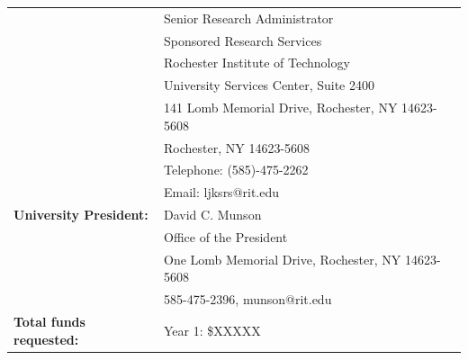 \documentclass[12pt]{article}
\begin{document}
\begin{titlepage}
\begin{tabular}{ L{50mm} L{100mm} }
   & \vspace{-8mm} \normalsize Senior Research Administrator  \\
   & \vspace{-10mm} \normalsize Sponsored Research Services  \\
   & \vspace{-12mm} \normalsize Rochester Institute of Technology  \\
   & \vspace{-14mm} \normalsize University Services Center, Suite 2400  \\
   & \vspace{-16mm} \normalsize 141 Lomb Memorial Drive, Rochester, NY 14623-5608   \\
   & \vspace{-18mm} \normalsize Rochester, NY 14623-5608  \\
   & \vspace{-20mm} \normalsize Telephone: (585)-475-2262  \\
   & \vspace{-22mm} \normalsize Email: ljksrs@rit.edu  \\
   
   
    \vspace{-14mm}\normalsize \textbf{University President:} & \vspace{-14mm} \normalsize David C. Munson \\

   & \vspace{-16mm} \normalsize Office of the President  \\
   & \vspace{-18mm} \normalsize One Lomb Memorial Drive, Rochester, NY 14623-5608  \\
   & \vspace{-20mm} \normalsize 585-475-2396, munson@rit.edu  \\ 
  
  \vspace{-22mm}    \normalsize \textbf{Total funds requested:} &  \vspace{-22mm} \normalsize Year 1: \$XXXXX \\


\end{tabular}
\end{titlepage}
\end{document}
